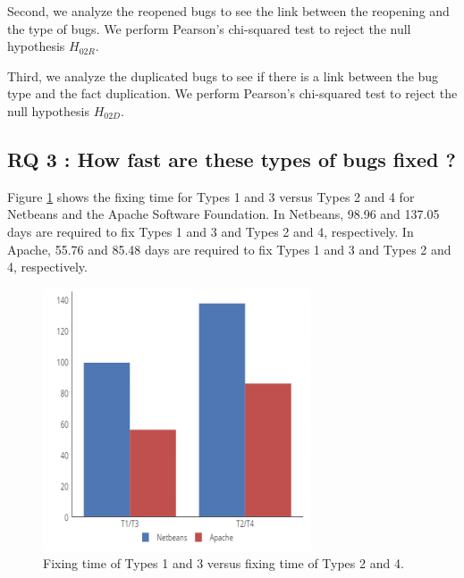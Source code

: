 Second, we analyze the reopened bugs to see the link
between the reopening and the type of bugs. We perform
Pearson’s chi-squared test to reject the null hypothesis $H_{02R}$.

\noindent{}

Third, we analyze the duplicated bugs to see if there is a
link between the bug type and the fact duplication. We
perform Pearson’s chi-squared test to reject the null
hypothesis $H_{02D}$.

\noindent{}

\subsection{RQ 3 : How fast are these types of bugs fixed ?}

Figure \ref{fig:bug-taxo-rq3} shows the fixing time for Types 1 and 3 versus
Types 2 and 4 for Netbeans and the Apache Software
Foundation. In Netbeans, 98.96 and 137.05 days are required
to fix Types 1 and 3 and Types 2 and 4, respectively. In
Apache, 55.76 and 85.48 days are required to fix Types 1 and
3 and Types 2 and 4, respectively.


\begin{figure}[h!]
  \centering
    \includegraphics[scale=0.8]{media/bug-taxo-rq3.png}
    \caption{Fixing time of Types 1 and 3 versus fixing time of Types 2 and 4.
    \label{fig:bug-taxo-rq3}}
\end{figure}

